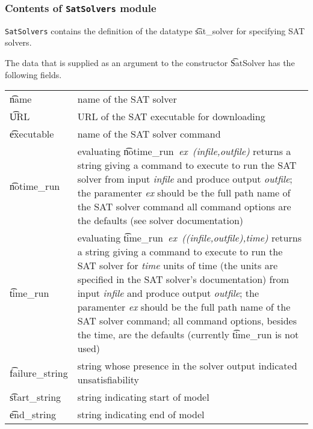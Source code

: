 
\subsubsection{Contents of {\tt SatSolvers} module}
{\tt SatSolvers} contains the definition of the datatype \t{sat\_solver} for specifying SAT solvers.


The data that is supplied as an argument to the constructor \t{SatSolver}
has the following fields.

\medskip

\begin{tabular}{lp{3.75in}}
\t{name} & name of the SAT solver \\

\t{URL} & URL of the SAT executable for downloading\\

\t{executable} &
name of the SAT solver command\\

\t{notime\_run} &
evaluating \t{notime\_run}{\it~ex~(infile,outfile)} returns a string giving a command to execute to run the SAT solver from input {\it infile} and produce output {\it outfile}; the paramenter {\it ex} should be the full path name of the  SAT solver command all command options are the defaults (see solver documentation)\\

\t{time\_run} &
evaluating \t{time\_run}{\it~ex~((infile,outfile),time)} returns a string giving a command to execute to run the SAT solver for {\it time} units of time (the units are specified in the SAT solver's documentation) from input {\it infile} and produce output {\it outfile}; the paramenter {\it ex} should be the full path name of the  SAT solver command; all command options, besides the time, are the defaults (currently \t{time\_run} is not used)\\

\t{failure\_string} & string whose presence in the solver output indicated unsatisfiability\\


\t{start\_string} &
string indicating start of model \\


\t{end\_string} &
string indicating end of model \\

\end{tabular}

